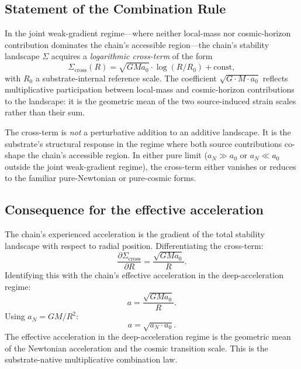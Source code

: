 \documentclass[11pt,a4paper]{article}
\begin{document}
\subsection{Statement of the Combination Rule}

In the joint weak-gradient regime---where neither local-mass nor cosmic-horizon contribution dominates the chain's accessible region---the chain's stability landscape $\Sigma$ acquires a \emph{logarithmic cross-term} of the form
\begin{equation}
\Sigma_{\mathrm{cross}}(R) = \sqrt{G M a_0} \cdot \log(R / R_0) + \mathrm{const},
\end{equation}
with $R_0$ a substrate-internal reference scale. The coefficient $\sqrt{G\cdot M \cdot a_0}$ reflects multiplicative participation between local-mass and cosmic-horizon contributions to the landscape: it is the geometric mean of the two source-induced strain scales rather than their sum.

The cross-term is \emph{not} a perturbative addition to an additive landscape. It is the substrate's structural response in the regime where both source contributions co-shape the chain's accessible region. In either pure limit ($a_N \gg a_0$ or $a_N \ll a_0$ outside the joint weak-gradient regime), the cross-term either vanishes or reduces to the familiar pure-Newtonian or pure-cosmic forms.

\subsection{Consequence for the effective acceleration}

The chain's experienced acceleration is the gradient of the total stability landscape with respect to radial position. Differentiating the cross-term:
\begin{equation}
\frac{\partial \Sigma_{\mathrm{cross}}}{\partial R} = \frac{\sqrt{G M a_0}}{R}.
\end{equation}
Identifying this with the chain's effective acceleration in the deep-acceleration regime:
\begin{equation}
a = \frac{\sqrt{G M a_0}}{R}.
\end{equation}
Using $a_N = G M / R^2$:
\begin{equation}
\boxed{\;a = \sqrt{a_N \cdot a_0}.\;}
\end{equation}
The effective acceleration in the deep-acceleration regime is the geometric mean of the Newtonian acceleration and the cosmic transition scale. This is the substrate-native multiplicative combination law.
\end{document}
